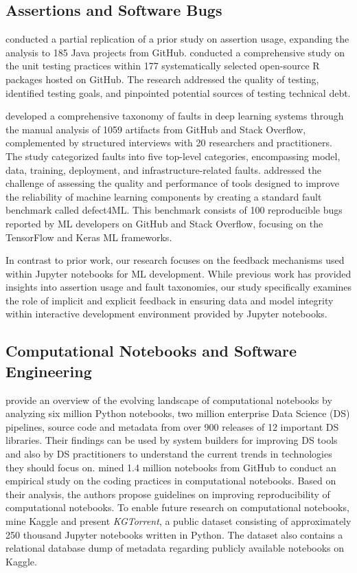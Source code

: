 \documentclass[journal]{IEEEtran}       %
\begin{document}
\subsection{Assertions and Software Bugs}

\cite{kochhar2017revisiting} conducted a partial replication of a
prior study on assertion usage, expanding the analysis to 185 Java
projects from GitHub. \cite{vidoni2021evaluating} conducted a
comprehensive study on the unit testing practices within 177
systematically selected open-source R packages hosted on GitHub. The
research addressed the quality of testing, identified testing goals,
and pinpointed potential sources of testing technical debt.

\cite{humbatova2020taxonomy} developed a comprehensive taxonomy of
faults in deep learning systems through the manual analysis of 1059
artifacts from GitHub and Stack Overflow, complemented by structured
interviews with 20 researchers and practitioners. The study
categorized faults into five top-level categories, encompassing
model, data, training, deployment, and infrastructure-related faults.
\cite{morovati2023bugs} addressed the challenge of assessing the
quality and performance of tools designed to improve the reliability
of machine learning components by creating a standard fault benchmark
called defect4ML. This benchmark consists of 100 reproducible bugs
reported by ML developers on GitHub and Stack Overflow, focusing on
the TensorFlow and Keras ML frameworks.

In contrast to prior work, our research focuses on the feedback
mechanisms used within Jupyter notebooks for ML development. While
previous work has provided insights into assertion usage and fault
taxonomies, our study specifically examines the role of implicit and
explicit feedback in ensuring data and model integrity within
interactive development environment provided by Jupyter notebooks.

\subsection{Computational Notebooks and Software
Engineering}\label{sec:notebooks}

\cite{psallidas2019data} provide an overview of the evolving
landscape of computational notebooks by analyzing six million Python
notebooks, two million enterprise Data Science (DS) pipelines, source
code and metadata from over 900 releases of 12 important DS
libraries. Their findings can be used by system builders for
improving DS tools and also by DS practitioners to understand the
current trends in technologies they should focus on.
\cite{pimentel2019large-scale} mined 1.4 million notebooks from
GitHub to conduct an empirical study on the coding practices in
computational notebooks. Based on their analysis, the authors propose
guidelines on improving reproducibility of computational notebooks.
To enable future research on computational notebooks,
\cite{quaranta2021kgtorrent} mine Kaggle and present
\textit{KGTorrent}, a public dataset consisting of approximately 250
thousand Jupyter notebooks written in Python. The dataset also
contains a relational database dump of metadata regarding publicly
available notebooks on Kaggle.
\end{document}
